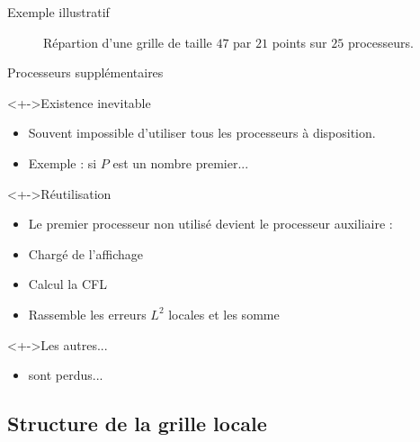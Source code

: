 \documentclass[17pt]{beamer}
\newenvironment{blockitemize}[1]{
  \begin{block}<+->{#1}
    \begin{itemize}
    }{
    \end{itemize}
  \end{block}
}
\begin{document}
\begin{frame}{Exemple illustratif}
  \begin{figure}
    \centering
    \caption{Répartion d'une grille de taille $47$ par $21$ points sur $25$ processeurs.}
    \label{fig:rep_proc}
  \end{figure}
\end{frame}


\begin{frame}{Processeurs supplémentaires}
  \begin{blockitemize}{Existence inevitable}
  \item Souvent impossible d'utiliser tous les processeurs à disposition.
  \item Exemple : si $P$ est un nombre premier...
  \end{blockitemize}
  \begin{blockitemize}{Réutilisation}
  \item Le premier processeur non utilisé devient le processeur auxiliaire :
  \item Chargé de l'affichage
  \item Calcul la CFL
  \item Rassemble les erreurs $L^2$ locales et les somme
  \end{blockitemize}
  \begin{blockitemize}{Les autres...}
  \item sont perdus...
  \end{blockitemize}
\end{frame}

  
\subsection{Structure de la grille locale}
\end{document}
